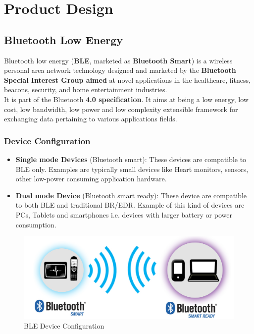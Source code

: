 \chapter{Product Design}
\section{Bluetooth Low Energy}
Bluetooth low energy (\textbf{BLE}, marketed as \textbf{Bluetooth Smart}) is a wireless personal area network technology designed and marketed by the \textbf{Bluetooth Special Interest Group aimed} at novel applications in the healthcare, fitness, beacons, security, and home entertainment industries. \\
It is part of the Bluetooth \textbf{4.0 specification}. It aims at being a low energy, low cost, low bandwidth, low power and low complexity extensible framework for exchanging data pertaining to various applications fields. 
\subsection{Device Configuration}
\begin{itemize}
	\item \textbf{Single mode Devices} (Bluetooth smart): These devices are compatible to BLE only. Examples are typically small devices like Heart monitors, sensors, other low-power consuming application hardware.
	\item \textbf{Dual mode Device} (Bluetooth smart ready): These device are compatible to both BLE and traditional BR/EDR. Example of this kind of devices are PCs, Tablets and smartphones i.e. devices with larger battery or power consumption.
\end{itemize}
\begin{figure}[ht]
	\centering
	\includegraphics[scale=0.5]{images/device_configuration.png}
	\caption{BLE Device Configuration}
\end{figure}
